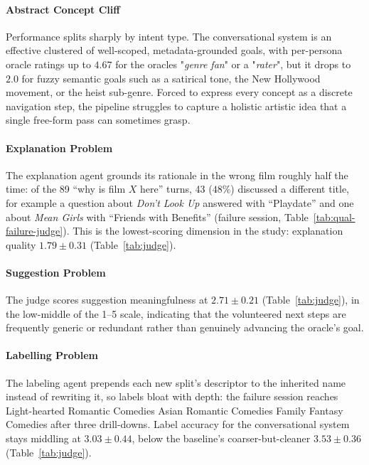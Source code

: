 \paragraph{Abstract Concept Cliff}
Performance splits sharply by intent type.
The conversational system is an effective clustered of well-scoped, metadata-grounded goals, with per-persona oracle ratings up to $4.67$ for the oracles "\emph{genre fan}" or a "\emph{rater}", but it drops to $2.0$ for fuzzy semantic goals such as a satirical tone, the New Hollywood movement, or the heist sub-genre.
Forced to express every concept as a discrete navigation step, the pipeline struggles to capture a holistic artistic idea that a single free-form pass can sometimes grasp.

\paragraph{Explanation Problem}
The explanation agent grounds its rationale in the wrong film roughly half the time: of the 89 ``why is film $X$ here'' turns, 43 ($48\%$) discussed a different title, for example a question about \emph{Don't Look Up} answered with ``Playdate'' and one about \emph{Mean Girls} with ``Friends with Benefits'' (failure session, Table~\ref{tab:qual-failure-judge}). 
This is the lowest-scoring dimension in the study: explanation quality $1.79\pm0.31$ (Table~\ref{tab:judge}).

\paragraph{Suggestion Problem}
The judge scores suggestion meaningfulness at $2.71\pm0.21$ (Table~\ref{tab:judge}), in the low-middle of the 1--5 scale, indicating that the volunteered next steps are frequently generic or redundant rather than genuinely advancing the oracle's goal.

\paragraph{Labelling Problem}
The labeling agent prepends each new split's descriptor to the inherited name instead of rewriting it, so labels bloat with depth: the failure session reaches \textsf{Light-hearted Romantic Comedies Asian Romantic Comedies Family Fantasy Comedies} after three drill-downs.
Label accuracy for the conversational system stays middling at $3.03\pm0.44$, below the baseline's coarser-but-cleaner $3.53\pm0.36$ (Table~\ref{tab:judge}).

